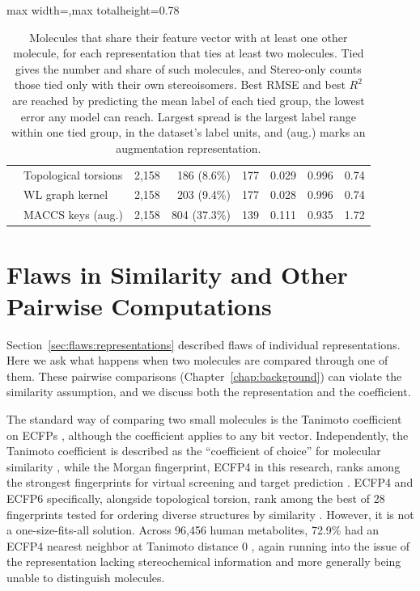 \begin{table}[htbp]
\begin{adjustbox}{max width=\textwidth,max totalheight=0.78\textheight}
\begin{tabular}{llrrrrrr}
 & Topological torsions & 2,158 & 186 (8.6\%) & 177 & 0.029 & 0.996 & 0.74 \\
 & WL graph kernel & 2,158 & 203 (9.4\%) & 177 & 0.028 & 0.996 & 0.74 \\
 & MACCS keys (aug.) & 2,158 & 804 (37.3\%) & 139 & 0.111 & 0.935 & 1.72 \\
\bottomrule
\end{tabular}
\end{adjustbox}
\caption[Molecules that share a feature vector with another molecule.]{Molecules that share their feature vector with at least one other molecule, for each representation that ties at least two molecules. Tied gives the number and share of such molecules, and Stereo-only counts those tied only with their own stereoisomers. Best RMSE and best $R^2$ are reached by predicting the mean label of each tied group, the lowest error any model can reach. Largest spread is the largest label range within one tied group, in the dataset's label units, and (aug.) marks an augmentation representation.}
\label{tab:flaws:ties}
\end{table}





\section{Flaws in Similarity and Other Pairwise Computations}\label{sec:flaws:similarity} %

Section~\ref{sec:flaws:representations} described flaws of individual representations. Here we ask what happens when two molecules are compared through one of them. These pairwise comparisons (Chapter~\ref{chap:background}) can violate the similarity assumption, and we discuss both the representation and the coefficient.


The standard way of comparing two small molecules is the Tanimoto coefficient on ECFPs \citep{LopezPerez2024}, although the coefficient applies to any bit vector. Independently, the Tanimoto coefficient is described as the ``coefficient of choice'' for molecular similarity \citep{Bajusz2015}, while the Morgan fingerprint, ECFP4 in this research, ranks among the strongest fingerprints for virtual screening and target prediction \citep{Capecchi2020}. ECFP4 and ECFP6 specifically, alongside topological torsion, rank among the best of 28 fingerprints tested for ordering diverse structures by similarity \citep{OBoyle2016}. However, it is not a one-size-fits-all solution. Across 96,456 human metabolites, 72.9\% had an ECFP4 nearest neighbor at Tanimoto distance 0 \citep{Capecchi2020}, again running into the issue of the representation lacking stereochemical information and more generally being unable to distinguish molecules. 

